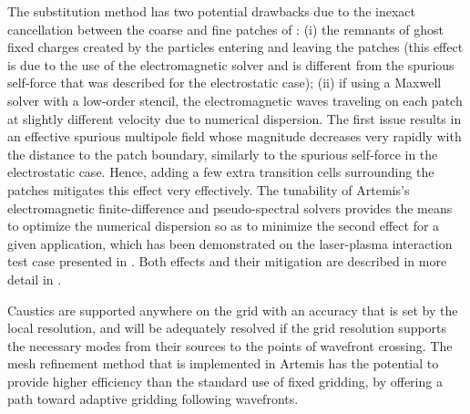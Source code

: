 The substitution method has two potential drawbacks due to the inexact cancellation between the coarse and fine patches of : (i) the remnants of ghost fixed charges created by the particles entering and leaving the patches (this effect is due to the use of the electromagnetic solver and is different from the spurious self-force that was described for the electrostatic case); (ii) if using a Maxwell solver with a low-order stencil, the electromagnetic waves traveling on each patch at slightly different velocity due to numerical dispersion.
The first issue results in an effective spurious multipole field whose magnitude decreases very rapidly with the distance to the patch boundary, similarly to the spurious self-force in the electrostatic case. Hence, adding a few extra transition cells surrounding the patches mitigates this effect very effectively.
The tunability of Artemis's electromagnetic finite-difference and pseudo-spectral solvers provides the means to optimize the numerical dispersion so as to minimize the second effect for a given application, which has been demonstrated on the laser-plasma interaction test case presented in \cite{Vaycpc04}.
Both effects and their mitigation are described in more detail in \cite{Vaycpc04}.

Caustics are supported anywhere on the grid with an accuracy that is set by the local resolution, and will be adequately resolved if the grid resolution supports the necessary  modes from their sources to the points of wavefront crossing. The mesh refinement method that is implemented in Artemis has the potential to provide higher efficiency than the standard use of fixed gridding, by offering a path toward adaptive gridding following wavefronts.

